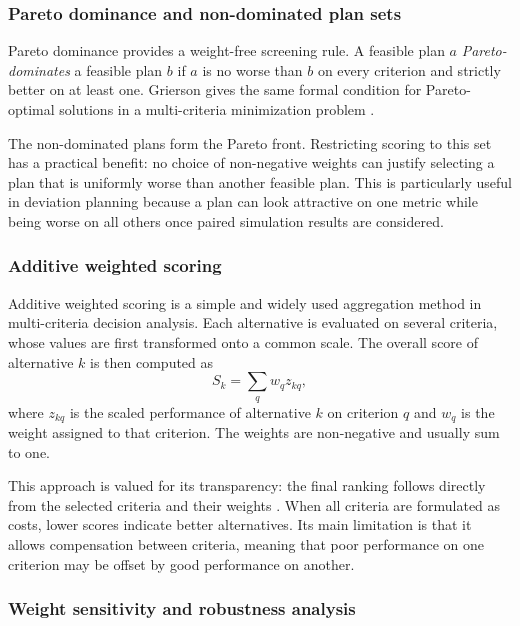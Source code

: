 \subsubsection{Pareto dominance and non-dominated plan sets}

Pareto dominance provides a weight-free screening rule. A feasible plan $a$
\textit{Pareto-dominates} a feasible plan $b$ if $a$ is no worse than $b$ on every criterion and
strictly better on at least one. Grierson gives the same formal condition for Pareto-optimal
solutions in a multi-criteria minimization problem \cite{GRIERSON2008371}.

The non-dominated plans form the Pareto front. Restricting scoring to this set has a practical
benefit: no choice of non-negative weights can justify selecting a plan that is uniformly worse
than another feasible plan. This is particularly useful in deviation planning because a plan can
look attractive on one metric while being worse on all others once paired simulation results are
considered.

\subsubsection{Additive weighted scoring}

Additive weighted scoring is a simple and widely used aggregation method in multi-criteria decision
analysis. Each alternative is evaluated on several criteria, whose values are first transformed onto
a common scale. The overall score of alternative $k$ is then computed as
\begin{equation}
  S_k = \sum_q w_q z_{kq},
\end{equation}
where $z_{kq}$ is the scaled performance of alternative $k$ on criterion $q$ and $w_q$ is the
weight assigned to that criterion. The weights are non-negative and usually sum to one.

This approach is valued for its transparency: the final ranking follows directly from the selected
criteria and their weights \cite{mcda_manual}. When all criteria are formulated as costs, lower
scores indicate better alternatives. Its main limitation is that it allows compensation between
criteria, meaning that poor performance on one criterion may be offset by good performance on
another.

\subsubsection{Weight sensitivity and robustness analysis}


